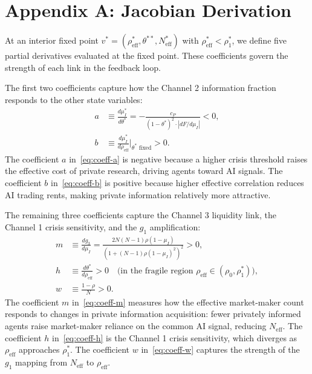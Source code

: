 \label{sec:appendix}

\section*{Appendix A: Jacobian Derivation}\label{app:jacobian}

At an interior fixed point $v^* = (\rho_{\text{eff}}^*, \theta^{**}, N_{\text{eff}}^*)$ with $\rho_{\text{eff}}^* < \rho_1^*$, we define five partial derivatives evaluated at the fixed point. These coefficients govern the strength of each link in the feedback loop.

The first two coefficients capture how the Channel 2 information fraction responds to the other state variables:
\begin{align}
  a &\equiv \frac{d\mu_I^*}{d\theta^*} = -\frac{c_P}{(1-\theta^*)^2 \cdot |dF/d\mu_I|} < 0, \label{eq:coeff-a}\\
  b &\equiv \frac{d\mu_I^*}{d\rho_{\text{eff}}}\bigg|_{\theta^* \text{ fixed}} > 0. \label{eq:coeff-b}
\end{align}
The coefficient $a$ in~\eqref{eq:coeff-a} is negative because a higher crisis threshold raises the effective cost of private research, driving agents toward AI signals. The coefficient $b$ in~\eqref{eq:coeff-b} is positive because higher effective correlation reduces AI trading rents, making private information relatively more attractive.

The remaining three coefficients capture the Channel 3 liquidity link, the Channel 1 crisis sensitivity, and the $g_1$ amplification:
\begin{align}
  m &\equiv \frac{dg_3}{d\mu_I} = \frac{2N(N-1)\rho(1-\mu_I)}{(1+(N-1)\rho(1-\mu_I)^2)^2} > 0, \label{eq:coeff-m}\\
  h &\equiv \frac{d\theta^*}{d\rho_{\text{eff}}} > 0 \quad \text{(in the fragile region } \rho_{\text{eff}} \in (\rho_0, \rho_1^*)\text{)}, \label{eq:coeff-h}\\
  w &\equiv \frac{1-\rho}{N} > 0. \label{eq:coeff-w}
\end{align}
The coefficient $m$ in~\eqref{eq:coeff-m} measures how the effective market-maker count responds to changes in private information acquisition: fewer privately informed agents raise market-maker reliance on the common AI signal, reducing $N_{\text{eff}}$. The coefficient $h$ in~\eqref{eq:coeff-h} is the Channel 1 crisis sensitivity, which diverges as $\rho_{\text{eff}}$ approaches $\rho_1^*$. The coefficient $w$ in~\eqref{eq:coeff-w} captures the strength of the $g_1$ mapping from $N_{\text{eff}}$ to $\rho_{\text{eff}}$.

